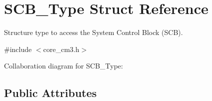 \hypertarget{structSCB__Type}{}\section{S\+C\+B\+\_\+\+Type Struct Reference}
\label{structSCB__Type}


Structure type to access the System Control Block (S\+CB).  




{\ttfamily \#include $<$core\+\_\+cm3.\+h$>$}



Collaboration diagram for S\+C\+B\+\_\+\+Type\+:
\subsection*{Public Attributes}
